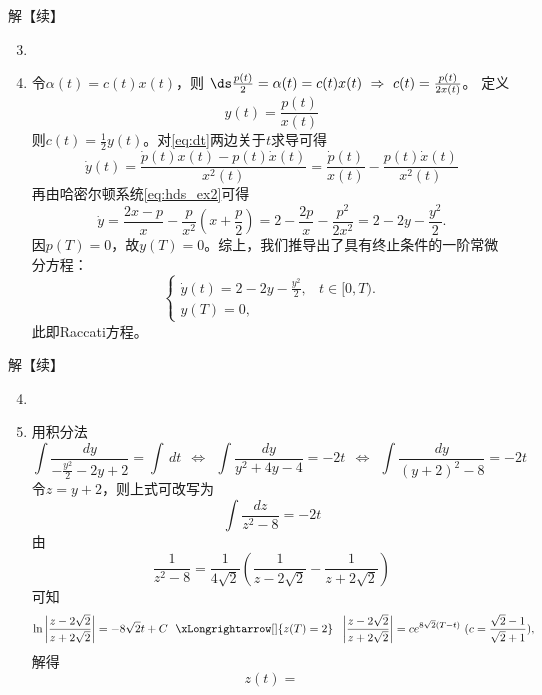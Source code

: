 \begin{frame}{\subsecname}
\small 
\begin{block}{解【续】}

\begin{enumerate} 
\setcounter{enumi}{2}
\item {}
\item[]  令$\alpha(t)=c(t)x(t)$，则
$
\ds \frac{p(t)}{2}=\alpha(t)=c(t)x(t) ~\Rightarrow~
c(t) = \frac{p(t)}{2x(t)}
$。
定义
\begin{equation}\label{eq:dt}
    y(t) = \frac{p(t)}{x(t)}
\end{equation}
则$c(t)=\frac12 y(t)$。对\eqref{eq:dt}两边关于$t$求导可得
$$
\dot y(t) = \frac{\dot p(t)x(t)-p(t)\dot x(t)}{x^2(t)} 
= \frac{\dot p(t)}{x(t)} - \frac{p(t)\dot x(t)}{{x^2(t)} }
$$
再由哈密尔顿系统\eqref{eq:hds_ex2}可得
$$
\dot y = \frac{2x-p}{x} - \frac{p}{x^2} (x+\frac{p}{2})
= 2 - \frac{2p}{x} - \frac{p^2}{2x^2} = 2-2y-\frac{y^2}{2}. 
$$
因$p(T)=0$，故$y(T)=0$。综上，我们推导出了具有终止条件的一阶常微分方程：
\begin{equation}\label{eq:raccati}
    \left\{
    \begin{array}{ll}
        \dot y(t) = 2-2y-\frac{y^2}{2},  &  t \in [0,T).  \\[0.05in]
        y(T) = 0, & 
    \end{array}
    \right.
\end{equation}
此即Raccati方程。
\end{enumerate}
\end{block}
\end{frame}

\begin{frame}{\subsecname}
\small 
\begin{block}{解【续】}

\begin{enumerate} 
\setcounter{enumi}{3}
\item {}
\item[]  用积分法
$$
\int \frac{dy}{-\frac{y^2}{2}-2y+2} = \int \,dt 
~~\Longleftrightarrow~~
\int \frac{dy}{y^2+4y-4} = -2 t 
~~\Longleftrightarrow~~
\int \frac{dy}{(y+2)^2-8} = -2 t 
$$
令$z=y+2$，则上式可改写为
$$
\int \frac{dz}{z^2-8} = -2 t 
$$
由
$$
\frac1{z^2-8} = \frac1{4\sqrt2} \left(\frac{1}{z-2\sqrt2}-\frac{1}{z+2\sqrt2}\right)
$$
可知
$$
\ln \left|\frac{z-2\sqrt2}{z+2\sqrt2}\right| = -8\sqrt2 t + C 
~~\xLongrightarrow[]{z(T)=2}~~
\left|\frac{z-2\sqrt2}{z+2\sqrt2}\right| = c e^{8\sqrt 2(T-t)} ~(c=\frac{\sqrt2-1}{\sqrt2+1}), 
$$
解得
$$
z(t) = 
$$
%

\end{enumerate}
\end{block}
\end{frame}

